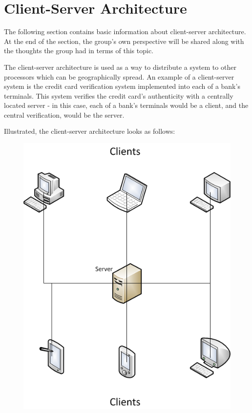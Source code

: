 \section{Client-Server Architecture}

The following section contains basic information about client-server architecture. At the 
end of the section, the group's own perspective will be shared along with the thoughts the 
group had in terms of this topic.

The client-server architecture is used as a way to distribute a system to other processors
which can be geographically spread\cite{ooad01}. An example of a client-server system is the 
credit card verification system implemented into each of a bank's terminals. This system 
verifies the credit card's authenticity with a centrally located server - in this case, each 
of a bank's terminals would be a client, and the central verification, would be the 
server\cite{ooad01}.

Illustrated, the client-server architecture looks as follows:

\begin{figure}[h]
	\centering
		\includegraphics[scale=0.50]{design/figures/client-server.png}
	\label{fig:client-server architecture}
\end{figure}


